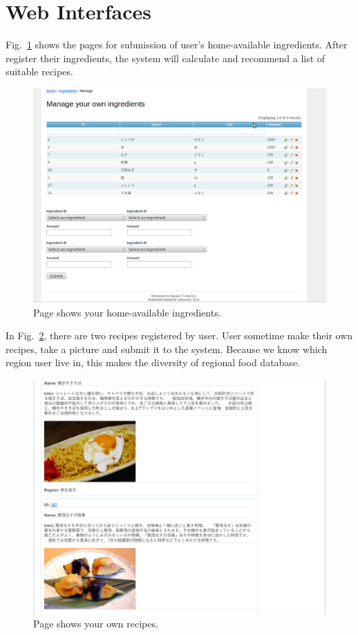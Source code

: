 \section{Web Interfaces}

Fig.~\ref{fig:your_ingredient} shows the pages for submission of user's home-available ingredients. After register their ingredients, the system will calculate and recommend a list of suitable recipes. 

\begin{figure}
\centering
\includegraphics[scale=0.5]{your_ingredient.eps}
\caption{Page shows your home-available ingredients.}
\label{fig:your_ingredient}
\end{figure}

In Fig.~\ref{fig:your_recipe}, there are two recipes registered by user. User sometime make their own recipes, take a picture and submit it to the system. Because we know which region user live in, this makes the diversity of regional food database.

\begin{figure}
\centering
\includegraphics[scale=0.5]{your_recipe.eps}
\caption{Page shows your own recipes.}
\label{fig:your_recipe}
\end{figure}

